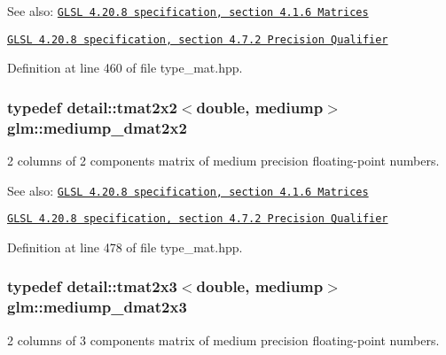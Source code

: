 \begin{Desc}
\item[See also:]\href{http://www.opengl.org/registry/doc/GLSLangSpec.4.20.8.pdf}{\tt GLSL 4.20.8 specification, section 4.1.6 Matrices} 

\href{http://www.opengl.org/registry/doc/GLSLangSpec.4.20.8.pdf}{\tt GLSL 4.20.8 specification, section 4.7.2 Precision Qualifier} \end{Desc}


Definition at line 460 of file type\_\-mat.hpp.\hypertarget{group__core__precision_g88ddb4188060ab00fee67c9840f4417e}{
\subsubsection[mediump\_\-dmat2x2]{\setlength{\rightskip}{0pt plus 5cm}typedef detail::tmat2x2$<$double, mediump$>$ {\bf glm::mediump\_\-dmat2x2}}}
\label{group__core__precision_g88ddb4188060ab00fee67c9840f4417e}


2 columns of 2 components matrix of medium precision floating-point numbers.

\begin{Desc}
\item[See also:]\href{http://www.opengl.org/registry/doc/GLSLangSpec.4.20.8.pdf}{\tt GLSL 4.20.8 specification, section 4.1.6 Matrices} 

\href{http://www.opengl.org/registry/doc/GLSLangSpec.4.20.8.pdf}{\tt GLSL 4.20.8 specification, section 4.7.2 Precision Qualifier} \end{Desc}


Definition at line 478 of file type\_\-mat.hpp.\hypertarget{group__core__precision_g734e988edf759c7012c443014acb6674}{
\subsubsection[mediump\_\-dmat2x3]{\setlength{\rightskip}{0pt plus 5cm}typedef detail::tmat2x3$<$double, mediump$>$ {\bf glm::mediump\_\-dmat2x3}}}
\label{group__core__precision_g734e988edf759c7012c443014acb6674}


2 columns of 3 components matrix of medium precision floating-point numbers.

